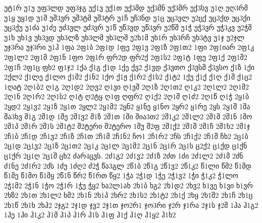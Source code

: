 {უტ1რ
უ1უ
უფ3ლდ
უფ3ჯგ
უქ1ვ
უქ1თ
უქ3მდ
უქ3მნ
უქ3მრ
უქ3სვ
უ1ღ
უღ3რმ
უ1ყ
უყ1დ
უ1შ
უშ3ვრ
უშ3ტმ
უშ3ტრ
უ1ჩ
უჩ3ნდ
უ1ც
უც3ვლ
უ2ცქ
უც3ქდ
უც3ქი
უც3ქუ
უ1ძა
უ1ძე
უძ3ვლ
უძ3ვრ
უ1წ
უწ3ვდ
უწ3ვრ
უ2წშ
უ1ჭ
უჭ3ვრ
უჭ3კვ
უ2ჭშ
უ1ხ
უხ1ვ
უხ3ვდ
უხ3ლზ
უხ3ლმ
უხ3ლშ
უ2ხ1მ
უხ1რ
უხ3რჩ
უხ3ტვ
უ1ჯ
უ2ჯლ
უჯ3რა
უჯ3რი
უ1ჰ
1ფა
2ფ1ბ
2ფ1დ
1ფე
2ფ1ვ
2ფ1ზ
2ფ1თ2
1ფი
2ფ1იარ
2ფ1კ
2ფ1ლ2
2ფ1მ
2ფ1ნ
1ფო
2ფ1რ
ფრ2დ
ფრ2ქ
2ფ1ს2
2ფ1ტ
1ფუ
2ფ1ქ
2ფ1შ2
2ფ1ჩ
2ფ1ც
ფხ2
ფ1ჯ2
1ქა
ქ1გ
ქ1დ
1ქე
ქვ2
ქ1ვდ
ქ3ვთო
ქ3ვსმ
ქ3ვსო
ქ1ზ
1ქი
2ქლ2
ქ1ლე
ქ1ლო
ქ1მ2
ქ1ნ2
1ქო
ქ1ჟ
ქ1რ2
ქ1ს2
ქ1ტ2
1ქუ
ქ1ქ
ქ1ღ
ქ1შ
ქ1ც2
1ღატ
2ღ1ბ2
ღ1გ
2ღ1დ2
2ღვ2
ღ1ვი
ღ1ვშ
2ღ1ზ
2ღ1თ2
ღ1კ2
2ღ1ლ2
2ღ1მ2
2ღ1ნ
2ღ1რ2
2ღ1ს2
ღ1ტ
ღ2ტყ
ღ1ფ
ღფრ2
ღ1ქ2
2ღ1შ
ღ1ძ2
2ღ1წ
ღ1ჭ
2ყ1ბ
2ყდ2
2ყ1ვ2
2ყ1ზ
2ყ1თ
2ყლ2
2ყ1მ2
2ყნ2
ყ1ნე
ყ1ნო
2ყრ2
ყ1რე
2ყს
2ყ1შ
1შა
შა3ხვ
შ1გ
2შ1დ
1შე
2შ1ვ2
შ1ზ
2შ1თ
1ში
შია3თ2
2შ1კ2
2შ1ლ2
2შ1მ
2შ1ნ
1შო
2შ1პ
2შ1რ
2შ1ს
2შ1ტ2
შ2ტერი
შ2ტერო
1შუ
შ2ფ
2შ1ქ2
2შ1შ
2შ1ჩ
2შ1ხ2
2შ1ჯ
2ჩ1ბ
2ჩ1დ
2ჩ1ვ2
2ჩ1ზ
2ჩ1თ
2ჩ1მ
2ჩ1ნ2
ჩო1
2ჩ1რ2
2ჩს
2ჩ1ქ2
2ჩ1შ
ჩხ2
2ც1ბ
2ც1დ
2ც1ვ2
2ც1ზ
2ც1თ2
2ც1კ
2ც1ლ
2ც1მ2
2ც1ნ
2ც1რ
2ც1ს
ც2ქ2
ც1ქდ
ც1ქნ
ც1ქრ
2ც1ღ
2ც1შ
ცხ2
ძარ4ცვს.
2ძ1გ2
2ძ1ვ2
2ძ1ზ
2ძთ
1ძი
2ძ1ლ2
2ძ1მ
2ძნ
ძ1ნე
2ძ1რ2
2ძს
1ძუ
1ძღ2
ძ2ჭ
წა3გლ
2წ1ბ
2წ1გ
2წ1ვ2
2წ1კ2
წ1ლი
წმ2
წ1მდ
წ1მე
წ1მო
წ1მყ
2წ1ნ
წრ2
წ1რთ
წყ2
1ჭა
2ჭ1დ
1ჭე
2ჭ1ვ2
1ჭი
ჭ1კ2
ჭ1ლო
2ჭ1მ2
2ჭ1ნ
1ჭო
2ჭ1რ
1ჭუ
ჭყ2
ხა2ლ1ახ
2ხ1ბ
ხგ2
2ხ1დ2
2ხვ2
ხ1ვე
ხ1ვი
ხ1ვრ
2ხზ2
2ხ1თ
2ხ1ლ2
ხმ2
2ხ1ნ
2ხ1პ
2ხრ2
2ხ1ს2
2ხ1ტ2
2ხ1ქ
2ხყ
2ხ1შ2
2ხ1ჩ
2ხ1ც
2ხ1წ
2ხ1ხ
2ხჰ2
2ჯგ2
2ჯ1დ
ჯვ2
2ჯ1თ
ჯო2რ1
ჯო3რი
ჯ2რ
ჯ1რა
2ჯ1ს
ჯ2შ
1ჰა
ჰ1გ2
1ჰე
1ჰი
ჰ1კ2
ჰ1მ
ჰ1პ
ჰ1რ
ჰ1ს
ჰ1ფ
ჰ1ქ
ჰ1ღ
ჰ1ყ2
ჰ1ხ2
}
